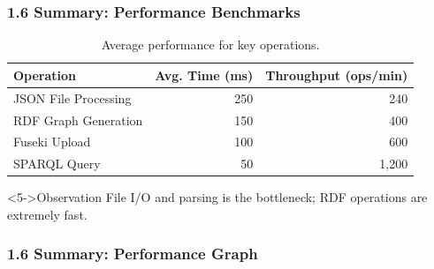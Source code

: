 \documentclass{beamer}
\begin{document}
\begin{frame}
    \frametitle{1.6 Summary: Performance Benchmarks}
    
    \begin{table}
        \centering
        \caption{Average performance for key operations.}
        \begin{tabular}{@{}lrr@{}}
            \toprule
            \textbf{Operation} & \textbf{Avg. Time (ms)} & \textbf{Throughput (ops/min)} \\
            \midrule
            JSON File Processing & 250 & 240 \\
            \pause
            RDF Graph Generation & 150 & 400 \\
            \pause
            Fuseki Upload & 100 & 600 \\
            \pause
            SPARQL Query & 50 & 1,200 \\
            \bottomrule
        \end{tabular}
    \end{table}
    
    \begin{alertblock}<5->{Observation}
        File I/O and parsing is the bottleneck; RDF operations are extremely fast.
    \end{alertblock}
\end{frame}


\begin{frame}
    \frametitle{1.6 Summary: Performance Graph}
    
    \begin{figure}
    \end{figure}
\end{frame}
\end{document}
